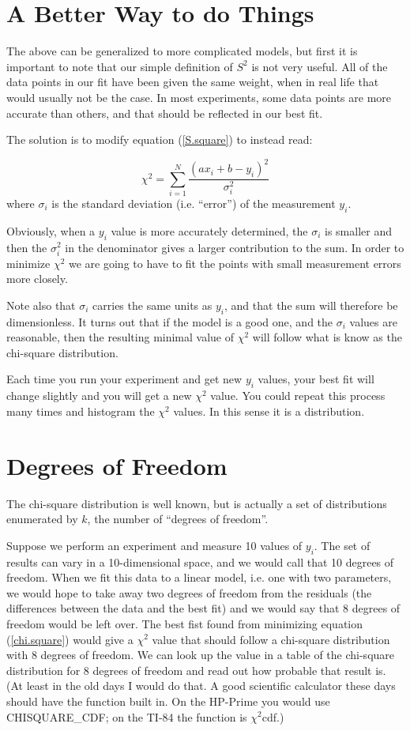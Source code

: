 \documentclass[letterpaper,12pt]{article}
\begin{document}
\section{A Better Way to do Things}

The above can be generalized to more complicated models, but first it is important to note that our simple definition of $S^2$ is not very useful. All of the data points in our fit have been given the same weight, when in real life that would usually not be the case. In most experiments, some data points are more accurate than others, and that should be reflected in our best fit.

The solution is to modify equation (\ref*{S.square}) to instead read:

\begin{equation} \label{chi.square}
\chi^2=\sum_{i=1}^N \frac{(a x_i + b - y_i)^2}{\sigma_i^2}
\end{equation}
where $\sigma_i$ is the standard deviation (i.e. ``error'') of the measurement $y_i$.

Obviously, when a $y_i$ value is more accurately determined, the $\sigma_i$ is smaller and then the $\sigma_i^2$ in the denominator gives a larger contribution to the sum. In order to minimize $\chi^2$ we are going to have to fit the points with small measurement errors more closely.

Note also that $\sigma_i$ carries the same units as $y_i$, and that the sum will therefore be dimensionless. It turns out that if the model is a good one, and the $\sigma_i$ values are reasonable, then the resulting minimal value of $\chi^2$ will follow what is know as the chi-square distribution. 

Each time you run your experiment and get new $y_i$ values, your best fit will change slightly and you will get a new $\chi^2$ value. You could repeat this process many 
times and histogram the $\chi^2$ values. In this sense it is a distribution.

\section{Degrees of Freedom}
The chi-square distribution is well known, but is actually a set of distributions enumerated by $k$, the number of ``degrees of freedom''.

Suppose we perform an experiment and measure 10 values of $y_i$. The set of results can vary in a 10-dimensional space, and we would call that 10 degrees of freedom. When we fit this data to a linear model, i.e. one with two parameters, we would hope to take away two degrees of freedom from the residuals (the differences between the data and the best fit) and we would say that 8 degrees of freedom would be left over. The best fist found from minimizing equation (\ref{chi.square}) would give a $\chi^2$ value that should follow a chi-square distribution with 8 degrees of freedom. We can look up the value in a table of the chi-square distribution for 8 degrees of freedom and read out how probable that result is. (At least in the old days I would do that. A good scientific calculator these days should have the function built in. On the HP-Prime you would use {\footnotesize CHISQUARE\_CDF}; on the TI-84 the function is $\chi^2$cdf.)
\end{document}

